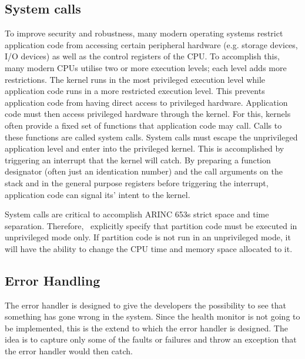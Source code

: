 \subsection{System calls}
\label{ssec:design_system_calls}
To improve security and robustness, many modern operating systems restrict
application code from accessing certain peripheral hardware (e.g. storage 
devices, I/O devices) as well as the control registers of the CPU.
To accomplish this, many modern CPUs utilise two or more execution levels; each
level adds more restrictions. The kernel runs in the most privileged execution
level while application code runs in a more restricted execution level. This 
prevents application code from having direct access to privileged hardware.
Application code must then access privileged hardware through the kernel. For
this, kernels often provide a fixed set of functions that application code may
call. Calls to these functions are called system calls. System calls must escape
the unprivileged application level and enter into the privileged kernel. This is
accomplished by triggering an interrupt that the kernel will catch. By preparing
a function designator (often just an identication number) and the call arguments
on the stack and in the general purpose registers before triggering the
interrupt, application code can signal its' intent to the kernel.

System calls are critical to accomplish ARINC 653\textquotesingle{}s strict 
space and time separation. Therefore, \arinc\ explicitly specify that partition
code must be executed in unprivileged mode only\cite{arinc_page_18}. If 
partition code is not run in an unprivileged mode, it will
have the ability to change the CPU time and memory space allocated to it. 

\subsection{Error Handling}
The error handler is designed to give the developers the possibility
to see that something has gone wrong in the system.
Since the health monitor is not going to be implemented,
this is the extend to which the error handler is designed.
The idea is to capture only
some of the faults or failures and throw an exception that the error
handler would then catch.




